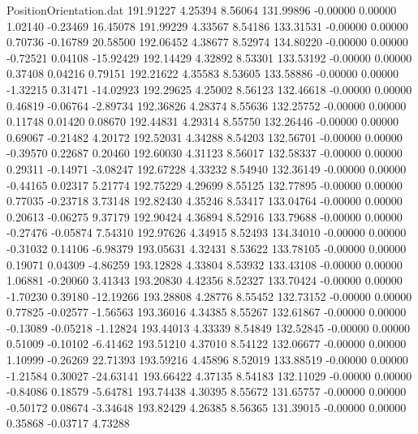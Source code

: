 \begin{filecontents}{PositionOrientation.dat}
 191.91227    4.25394    8.56064   131.99896   -0.00000    0.00000    1.02140   -0.23469   16.45078
 191.99229    4.33567    8.54186   133.31531   -0.00000    0.00000    0.70736   -0.16789   20.58500
 192.06452    4.38677    8.52974   134.80220   -0.00000    0.00000   -0.72521    0.04108  -15.92429
 192.14429    4.32892    8.53301   133.53192   -0.00000    0.00000    0.37408    0.04216    0.79151
 192.21622    4.35583    8.53605   133.58886   -0.00000    0.00000   -1.32215    0.31471  -14.02923
 192.29625    4.25002    8.56123   132.46618   -0.00000    0.00000    0.46819   -0.06764   -2.89734
 192.36826    4.28374    8.55636   132.25752   -0.00000    0.00000    0.11748    0.01420    0.08670
 192.44831    4.29314    8.55750   132.26446   -0.00000    0.00000    0.69067   -0.21482    4.20172
 192.52031    4.34288    8.54203   132.56701   -0.00000    0.00000   -0.39570    0.22687    0.20460
 192.60030    4.31123    8.56017   132.58337   -0.00000    0.00000    0.29311   -0.14971   -3.08247
 192.67228    4.33232    8.54940   132.36149   -0.00000    0.00000   -0.44165    0.02317    5.21774
 192.75229    4.29699    8.55125   132.77895   -0.00000    0.00000    0.77035   -0.23718    3.73148
 192.82430    4.35246    8.53417   133.04764   -0.00000    0.00000    0.20613   -0.06275    9.37179
 192.90424    4.36894    8.52916   133.79688   -0.00000    0.00000   -0.27476   -0.05874    7.54310
 192.97626    4.34915    8.52493   134.34010   -0.00000    0.00000   -0.31032    0.14106   -6.98379
 193.05631    4.32431    8.53622   133.78105   -0.00000    0.00000    0.19071    0.04309   -4.86259
 193.12828    4.33804    8.53932   133.43108   -0.00000    0.00000    1.06881   -0.20060    3.41343
 193.20830    4.42356    8.52327   133.70424   -0.00000    0.00000   -1.70230    0.39180  -12.19266
 193.28808    4.28776    8.55452   132.73152   -0.00000    0.00000    0.77825   -0.02577   -1.56563
 193.36016    4.34385    8.55267   132.61867   -0.00000    0.00000   -0.13089   -0.05218   -1.12824
 193.44013    4.33339    8.54849   132.52845   -0.00000    0.00000    0.51009   -0.10102   -6.41462
 193.51210    4.37010    8.54122   132.06677   -0.00000    0.00000    1.10999   -0.26269   22.71393
 193.59216    4.45896    8.52019   133.88519   -0.00000    0.00000   -1.21584    0.30027  -24.63141
 193.66422    4.37135    8.54183   132.11029   -0.00000    0.00000   -0.84086    0.18579   -5.64781
 193.74438    4.30395    8.55672   131.65757   -0.00000    0.00000   -0.50172    0.08674   -3.34648
 193.82429    4.26385    8.56365   131.39015   -0.00000    0.00000    0.35868   -0.03717    4.73288

\end{filecontents}
